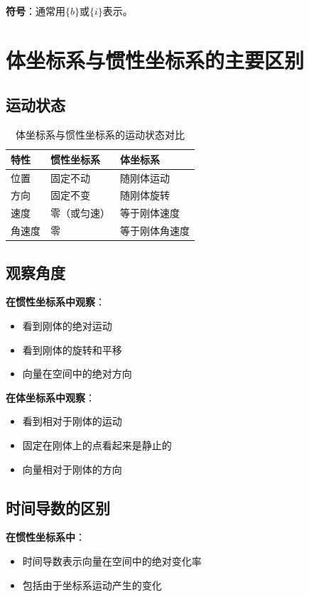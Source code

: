 \documentclass[12pt,a4paper]{article}
\begin{document}
\textbf{符号}：通常用$\{b\}$或$\{i\}$表示。

\section{体坐标系与惯性坐标系的主要区别}

\subsection{运动状态}

\begin{table}[h]
\centering
\begin{tabular}{|l|l|l|}
\hline
\textbf{特性} & \textbf{惯性坐标系} & \textbf{体坐标系} \\
\hline
位置 & 固定不动 & 随刚体运动 \\
\hline
方向 & 固定不变 & 随刚体旋转 \\
\hline
速度 & 零（或匀速） & 等于刚体速度 \\
\hline
角速度 & 零 & 等于刚体角速度 \\
\hline
\end{tabular}
\caption{体坐标系与惯性坐标系的运动状态对比}
\end{table}

\subsection{观察角度}

\textbf{在惯性坐标系中观察}：
\begin{itemize}
\item 看到刚体的绝对运动
\item 看到刚体的旋转和平移
\item 向量在空间中的绝对方向
\end{itemize}

\textbf{在体坐标系中观察}：
\begin{itemize}
\item 看到相对于刚体的运动
\item 固定在刚体上的点看起来是静止的
\item 向量相对于刚体的方向
\end{itemize}

\subsection{时间导数的区别}

\textbf{在惯性坐标系中}：
\begin{itemize}
\item 时间导数表示向量在空间中的绝对变化率
\item 包括由于坐标系运动产生的变化
\end{itemize}
\end{document}
